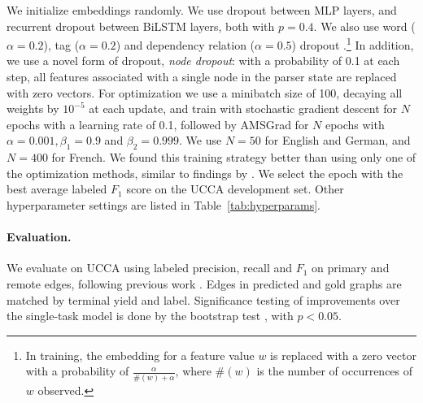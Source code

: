 \documentclass[11pt,a4paper]{article}
\newcommand{\oa}[1]{\footnote{\color{red}OA: #1}}
\DeclareMathOperator*{\argmax}{argmax}
\begin{document}
We initialize embeddings randomly.
We use dropout \cite{srivastava2014dropout} between MLP layers, and recurrent dropout
\cite{NIPS2016_6241} between BiLSTM layers, both with $p=0.4$.
We also use word ($\alpha=0.2$), tag ($\alpha=0.2$) and dependency relation ($\alpha=0.5$) dropout
\cite{kiperwasser2016simple}.\footnote{In training, the embedding for a feature value $w$ is
replaced with a zero vector with a probability of $\frac{\alpha}{\#(w)+\alpha}$,
where $\#(w)$ is the number of occurrences of $w$ observed.}
In addition, we use a novel form of dropout, \textit{node dropout}:
with a probability of 0.1 at each step, all features associated with a single
node in the parser state are replaced with zero vectors.
For optimization we use a minibatch size of 100, decaying all weights by $10^{-5}$ at each update,
and train with stochastic gradient descent for $N$ epochs with a learning
rate of 0.1, followed by AMSGrad \cite{j.2018on} for $N$ epochs with
$\alpha=0.001,\beta_1=0.9$ and $\beta_2=0.999$.
We use $N=50$ for English and German, and $N=400$ for French.
We found this training strategy better than using only one of the optimization methods,
similar to findings by \citet{keskar2017improving}.
We select the epoch with the best average labeled $F_1$ score on the
UCCA development set.
Other hyperparameter settings are listed in Table~\ref{tab:hyperparams}.


\paragraph{Evaluation.}

We evaluate on UCCA using labeled precision, recall and $F_1$ 
on primary and remote edges,
following previous work \cite{hershcovich2017a}.
Edges in predicted and gold graphs are matched by terminal yield and label.
Significance testing of improvements over the single-task model is done
by the bootstrap test \cite{berg2012empirical}, with $p<0.05$.

%
%
\end{document}
